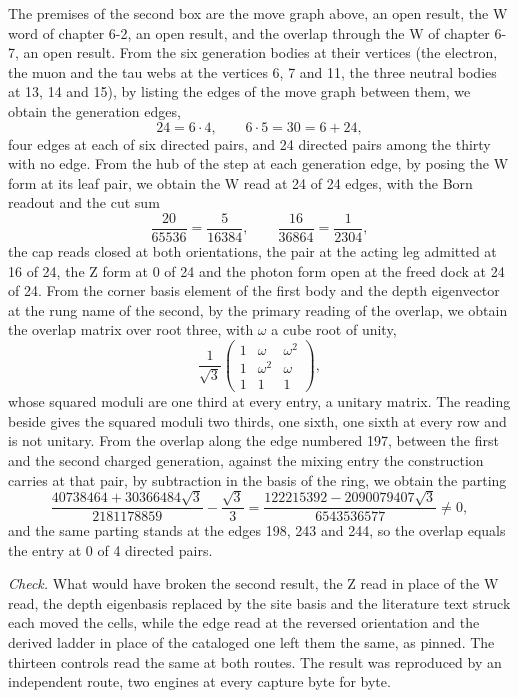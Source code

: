 \begin{chproof}
The premises of the second box are the move graph above, an open result, the W word of chapter 6-2, an open result, and the overlap through the W of chapter 6-7, an open result. From the six generation bodies at their vertices (the electron, the muon and the tau webs at the vertices 6, 7 and 11, the three neutral bodies at 13, 14 and 15), by listing the edges of the move graph between them, we obtain the generation edges,
\begin{equation}
24 = 6 \cdot 4 , \qquad 6 \cdot 5 = 30 = 6 + 24 ,
\end{equation}
four edges at each of six directed pairs, and 24 directed pairs among the thirty with no edge. From the hub of the step at each generation edge, by posing the W form at its leaf pair, we obtain the W read at 24 of 24 edges, with the Born readout and the cut sum
\begin{equation}
\frac{20}{65536} = \frac{5}{16384}, \qquad \frac{16}{36864} = \frac{1}{2304} ,
\end{equation}
the cap reads closed at both orientations, the pair at the acting leg admitted at 16 of 24, the Z form at 0 of 24 and the photon form open at the freed dock at 24 of 24. From the corner basis element of the first body and the depth eigenvector at the rung name of the second, by the primary reading of the overlap, we obtain the overlap matrix over root three, with $\omega$ a cube root of unity,
\begin{equation}
\frac{1}{\sqrt{3}}\begin{pmatrix} 1 & \omega & \omega^{2} \\ 1 & \omega^{2} & \omega \\ 1 & 1 & 1 \end{pmatrix},
\end{equation}
whose squared moduli are one third at every entry, a unitary matrix. The reading beside gives the squared moduli two thirds, one sixth, one sixth at every row and is not unitary. From the overlap along the edge numbered 197, between the first and the second charged generation, against the mixing entry the construction carries at that pair, by subtraction in the basis of the ring, we obtain the parting
\begin{equation}
\frac{40738464 + 30366484\sqrt{3}}{2181178859} - \frac{\sqrt{3}}{3} = \frac{122215392 - 2090079407\sqrt{3}}{6543536577} \neq 0 ,
\end{equation}
and the same parting stands at the edges 198, 243 and 244, so the overlap equals the entry at 0 of 4 directed pairs.

\emph{Check.} What would have broken the second result, the Z read in place of the W read, the depth eigenbasis replaced by the site basis and the literature text struck each moved the cells, while the edge read at the reversed orientation and the derived ladder in place of the cataloged one left them the same, as pinned. The thirteen controls read the same at both routes. The result was reproduced by an independent route, two engines at every capture byte for byte.
\end{chproof}
